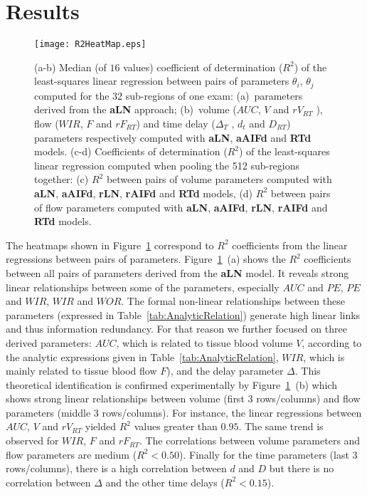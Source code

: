 \section{Results}
\begin{figure}[ht]
  \centering
  \texttt{[image: R2HeatMap.eps]}
  \caption{(a-b) Median (of $16$ values) coefficient of determination ($R^2$) of the least-squares linear regression between pairs of parameters $\theta_i$, $\theta_j$ computed for the 32 sub-regions of one exam: (a)~parameters derived from the \textbf{aLN} approach; (b)~volume ($AUC$, $V$ and $rV_{RT}$ ), flow ($WIR$, $F$ and $rF_{RT}$) and time delay ($\Delta_T$ , $d_t$ and $D_{RT}$) parameters respectively computed with \textbf{aLN}, \textbf{aAIFd}  and \textbf{RTd} models. (c-d) Coefficients of determination ($R^2$) of the least-squares linear regression computed when pooling the 512 sub-regions  together: (c) $R^2$ between pairs of volume parameters computed with \textbf{aLN}, \textbf{aAIFd}, \textbf{rLN}, \textbf{rAIFd}  and \textbf{RTd} models, (d) $R^2$ between pairs of flow parameters computed with \textbf{aLN}, \textbf{aAIFd}, \textbf{rLN}, \textbf{rAIFd}  and \textbf{RTd} models.}
  \label{fig:R2HeatMaps}
\end{figure}

The heatmaps shown in Figure~\ref{fig:R2HeatMaps} correspond to $R^2$ coefficients from the linear regressions between pairs of parameters. Figure~\ref{fig:R2HeatMaps}~(a) shows the $R^2$ coefficients between all pairs of parameters derived from the \textbf{aLN} model. It reveals strong linear relationships between some of the parameters, especially $AUC$ and $PE$,  $PE$ and $WIR$,  $WIR$ and $WOR$. The formal non-linear relationships between these parameters (expressed in Table~\ref{tab:AnalyticRelation}) generate high linear links and thus information redundancy.  For that reason we further focused on three derived parameters: $AUC$, which is related to tissue blood volume $V$, according to the analytic expressions given in Table~\ref{tab:AnalyticRelation}, $WIR$, which is mainly related to tissue blood flow $F$), and the delay parameter $\Delta$. This theoretical identification is confirmed experimentally by Figure~\ref{fig:R2HeatMaps}~(b) which shows strong linear relationships between volume (first 3 rows/columns) and flow parameters (middle 3 rows/columns). For instance, the linear regressions between $AUC$, $V$ and $rV_{RT}$ yielded $R^2$ values greater than $0.95$. The same trend is observed for $WIR$, $F$ and $rF_{RT}$. The correlations between volume parameters and flow parameters are medium ($R^2 < 0.50$). Finally for the time parameters (last 3 rows/columns), there is a high correlation between $d$ and $D$ but there is no correlation between $\Delta$ and the other time delays ($R^2 < 0.15$). 

